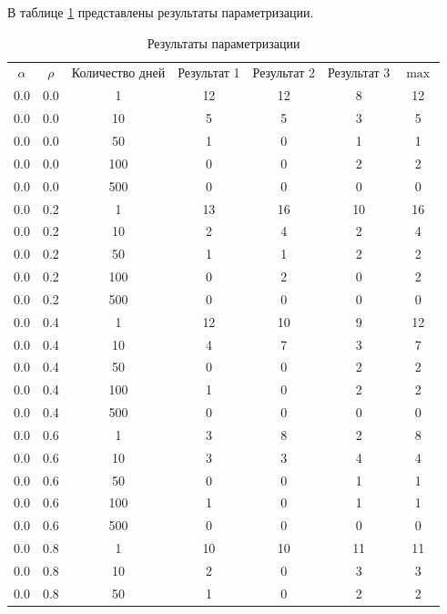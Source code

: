 В таблице \ref{tbl:par} представлены результаты параметризации.
\begin{longtable}{|c|c|c|c|c|c|c|}
	\captionsetup{justification=raggedright,singlelinecheck=false}
	\caption{\label{tbl:par}Результаты параметризации}\\
	
	\hline
	$\alpha$ & $\rho$ & Количество дней & Результат 1 & Результат 2 & Результат 3 & $\max$\\
	\hline
	0.0 &  0.0 &    1 &    12 &    12 &     8 &    12 \\
	0.0 &  0.0 &   10 &     5 &     5 &     3 &     5 \\
	0.0 &  0.0 &   50 &     1 &     0 &     1 &     1 \\
	0.0 &  0.0 &  100 &     0 &     0 &     2 &     2 \\
	0.0 &  0.0 &  500 &     0 &     0 &     0 &     0 \\ \hline
	0.0 &  0.2 &    1 &    13 &    16 &    10 &    16 \\
	0.0 &  0.2 &   10 &     2 &     4 &     2 &     4 \\
	0.0 &  0.2 &   50 &     1 &     1 &     2 &     2 \\
	0.0 &  0.2 &  100 &     0 &     2 &     0 &     2 \\
	0.0 &  0.2 &  500 &     0 &     0 &     0 &     0 \\ \hline
	0.0 &  0.4 &    1 &    12 &    10 &     9 &    12 \\
	0.0 &  0.4 &   10 &     4 &     7 &     3 &     7 \\
	0.0 &  0.4 &   50 &     0 &     0 &     2 &     2 \\
	0.0 &  0.4 &  100 &     1 &     0 &     2 &     2 \\
	0.0 &  0.4 &  500 &     0 &     0 &     0 &     0 \\ \hline
	0.0 &  0.6 &    1 &     3 &     8 &     2 &     8 \\
	0.0 &  0.6 &   10 &     3 &     3 &     4 &     4 \\
	0.0 &  0.6 &   50 &     0 &     0 &     1 &     1 \\
	0.0 &  0.6 &  100 &     1 &     0 &     1 &     1 \\
	0.0 &  0.6 &  500 &     0 &     0 &     0 &     0 \\ \hline
	0.0 &  0.8 &    1 &    10 &    10 &    11 &    11 \\
	0.0 &  0.8 &   10 &     2 &     0 &     3 &     3 \\
	0.0 &  0.8 &   50 &     1 &     0 &     2 &     2 \\

\end{longtable}
